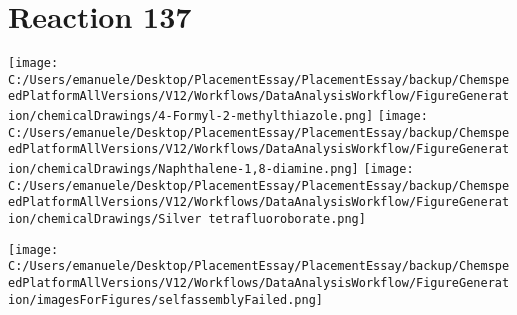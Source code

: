 \documentclass{article}%
\begin{document}
\section*{Reaction 137}%
%
\begin{scheme}[H]%
\begin{minipage}{0.5\textwidth}%
\texttt{[image: C:/Users/emanuele/Desktop/PlacementEssay/PlacementEssay/backup/ChemspeedPlatformAllVersions/V12/Workflows/DataAnalysisWorkflow/FigureGeneration/chemicalDrawings/4-Formyl-2-methylthiazole.png]}%
\texttt{[image: C:/Users/emanuele/Desktop/PlacementEssay/PlacementEssay/backup/ChemspeedPlatformAllVersions/V12/Workflows/DataAnalysisWorkflow/FigureGeneration/chemicalDrawings/Naphthalene-1,8-diamine.png]}%
\texttt{[image: C:/Users/emanuele/Desktop/PlacementEssay/PlacementEssay/backup/ChemspeedPlatformAllVersions/V12/Workflows/DataAnalysisWorkflow/FigureGeneration/chemicalDrawings/Silver tetrafluoroborate.png]}%
\end{minipage}%
\begin{minipage}{0.5\textwidth}%
\begin{center}%
\texttt{[image: C:/Users/emanuele/Desktop/PlacementEssay/PlacementEssay/backup/ChemspeedPlatformAllVersions/V12/Workflows/DataAnalysisWorkflow/FigureGeneration/imagesForFigures/selfassemblyFailed.png]}%
\end{center}%
\end{minipage}%
\caption{Self-assembly of components 1, 21, with Silver(I) in a 3.0:1.5:1.0 molar ratio in CH$_3$CN at 60\textdegree C for 40h. These are the reagents (starting materials) for reaction 137.}%
\end{scheme}%
\end{document}
